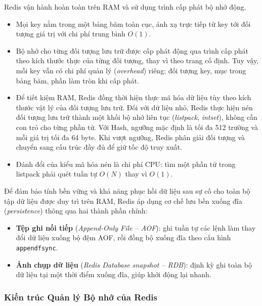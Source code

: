 Redis vận hành hoàn toàn trên RAM và sử dụng trình cấp phát bộ nhớ động.
\begin{itemize}
    \item Mọi key nằm trong một bảng băm toàn cục, ánh xạ trực tiếp từ key tới đối tượng giá trị với chi phí trung bình $O(1)$. 
    \item Bộ nhớ cho từng đối tượng lưu trữ được cấp phát động qua trình cấp phát theo kích thước thực của từng đối tượng, thay vì theo trang cố định. Tuy vậy, mỗi key vẫn có chi phí quản lý (\textit{overhead}) riêng: đối tượng key, mục trong bảng băm, phần làm tròn khi cấp phát.
    \item Để tiết kiệm RAM, Redis đồng thời hiện thực mã hóa dữ liệu tùy theo kích thước vật lý của đối tượng lưu trữ. Đối với dữ liệu nhỏ, Redis thực hiện nén đối tượng lưu trữ thành một khối bộ nhớ liên tục (\textit{listpack}, \textit{intset}), không cần con trỏ cho từng phần tử. Với Hash, ngưỡng mặc định là tối đa 512 trường và mỗi giá trị tối đa 64 byte. Khi vượt ngưỡng, Redis phân giải đối tượng và chuyển sang cấu trúc đầy đủ để giữ tốc độ truy xuất.
    \item Đánh đổi của kiểu mã hóa nén là chi phí CPU: tìm một phần tử trong listpack phải quét tuần tự $O(N)$ thay vì $O(1)$.
\end{itemize}

Để đảm bảo tính bền vững và khả năng phục hồi dữ liệu sau sự cố cho toàn bộ tập dữ liệu được duy trì trên RAM, Redis áp dụng cơ chế lưu bền xuống đĩa (\textit{persistence}) thông qua hai thành phần chính:
\begin{itemize}
    \item \textbf{Tệp ghi nối tiếp} (\textit{Append-Only File -- AOF}): ghi tuần tự các lệnh làm thay đổi dữ liệu xuống bộ đệm AOF, rồi đồng bộ xuống đĩa theo cấu hình \texttt{appendfsync}.
    \item \textbf{Ảnh chụp dữ liệu} (\textit{Redis Database snapshot -- RDB}): định kỳ ghi toàn bộ dữ liệu tại một thời điểm xuống đĩa, giúp khởi động lại nhanh.
\end{itemize}


\subsubsection{Kiến trúc Quản lý Bộ nhớ của Redis}

